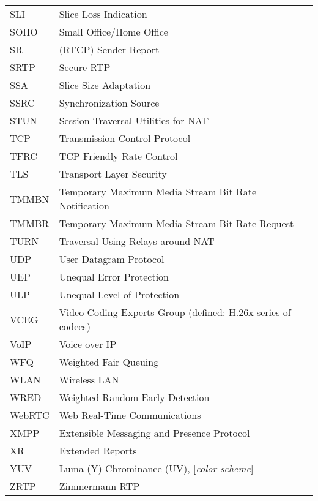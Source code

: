 \begin{longtable}{ll}
SLI 	& Slice Loss Indication \\
SOHO 	& Small Office/Home Office \\
SR  	& (RTCP) Sender Report \\
SRTP 	& Secure RTP \\
SSA 	& Slice Size Adaptation \\
SSRC 	& Synchronization Source \\
STUN 	& Session Traversal Utilities for NAT \\
TCP 	& Transmission Control Protocol \\
TFRC 	& TCP Friendly Rate Control \\
TLS 	& Transport Layer Security \\
TMMBN 	& Temporary Maximum Media Stream Bit Rate Notification \\
TMMBR 	& Temporary Maximum Media Stream Bit Rate Request \\
TURN 	& Traversal Using Relays around NAT \\
UDP 	& User Datagram Protocol \\
UEP 	& Unequal Error Protection \\
ULP 	& Unequal Level of Protection \\
VCEG 	& Video Coding Experts Group (defined: H.26x series of codecs)\\
VoIP 	& Voice over IP \\
WFQ 	& Weighted Fair Queuing \\
WLAN	& Wireless LAN \\
WRED 	& Weighted Random Early Detection \\
WebRTC	& Web Real-Time Communications \\
XMPP 	& Extensible Messaging and Presence Protocol \\
XR  	& Extended Reports \\
YUV 	& Luma (Y) Chrominance (UV), [\textit{color scheme}] \\
ZRTP 	& Zimmermann RTP \\
\end{longtable}
